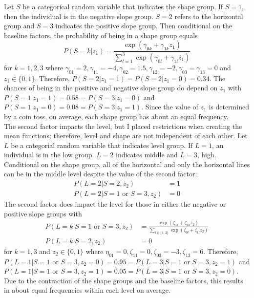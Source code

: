 \documentclass[12pt]{article}
\begin{document}
Let $S$ be a categorical random variable that indicates the shape group. If $S=1$, then the individual is in the negative slope group. $S=2$ refers to the horizontal group and $S=3$ indicates the positive slope group. Then conditional on the baseline factors, the probability of being in a shape group equals
$$P(S=k |z_{1}) = \frac{\exp(\gamma_{0k}+\gamma_{1k}z_{1})}{\sum^{3}_{l=1} \exp(\gamma_{0l}+\gamma_{1l}z_{1})}$$
for $k=1,2,3$ where $\gamma_{01}=2,\gamma_{11} = -4,\gamma_{02}=1.5,\gamma_{12}=-2,\gamma_{03}=\gamma_{13} = 0$ and $z_{1}\in\{0,1\}$. Therefore, $P(S=2|z_{1}=1) = P(S=2|z_{1}=0) = 0.34$. The chances of being in the positive and negative slope group do depend on $z_{1}$ with $P(S=1|z_{1}=1) = 0.58 = P(S=3|z_{1}=0)$ and $P(S=1|z_{1}=0) = 0.08 = P(S=3|z_{1}=1)$. Since the value of $z_{1}$ is determined by a coin toss, on average, each shape group has about an equal  frequency. \\

The second factor impacts the level, but I placed restrictions when creating the mean functions; therefore, level and shape are not independent of each other. Let $L$ be a categorial random variable that indicates level group. If $L=1$, an individual is in the low group. $L=2$ indicates middle and $L=3$, high. Conditional on the shape group, all of the horizontal and only the horizontal lines can be in the middle level despite the value of the second factor:
\begin{align*}
P(L=2|S=2, z_{2}) & = 1\\
P(L=2|S=1 \text{ or } S=3, z_{2}) & = 0
\end{align*}
The second factor does impact the level for those in either the negative or positive slope groups with
\begin{align*}
P(L=k|S=1 \text{ or } S=3,z_{2}) & = \frac{\exp(\zeta_{0k}+\zeta_{1k} z_{2})}{\sum_{l\in\{1,3\} }\exp(\zeta_{0l}+\zeta_{1l}z_{2})}\\
P(L=k|S=2,z_{2}) & =0
\end{align*}
for $k=1,3$ and $z_{2}\in\{0,1\}$ where $\eta_{01}=0,\zeta_{11}=0,\zeta_{03}=-3,\zeta_{13}=6$. Therefore, $P(L=1|S=1 \text{ or }S=3,z_{2}=0) = 0.95 = P(L=3|S=1 \text{ or }S=3,z_{2}=1)$ and $P(L=1|S=1 \text{ or }S=3,z_{2}=1) = 0.05 = P(L=3|S=1 \text{ or }S=3,z_{2}=0)$.  Due to the contraction of the shape groups and the baseline factors, this results in about equal frequencies within each level on average.\\
\end{document}

